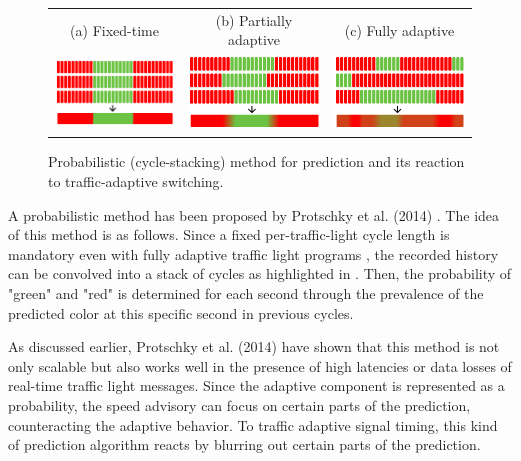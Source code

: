 \begin{figure}[b]
\centering 
\begin{tabular}{ccc}
\footnotesize{(a) Fixed-time} & \footnotesize{(b) Partially adaptive} & \footnotesize{(c) Fully adaptive} \\
\includegraphics[width=0.3\linewidth]{images/explanation-fixed-time.png} & \includegraphics[width=0.3\linewidth]{images/explanation-partially-adaptive.png} & \includegraphics[width=0.3\linewidth]{images/explanation-fully-adaptive.png}
\end{tabular}
\caption{Probabilistic (cycle-stacking) method for prediction and its reaction to traffic-adaptive switching.}
\label{fig:prediction}
\end{figure}

A probabilistic method has been proposed by Protschky et al. (2014) \cite{protschky_extensive_2014, protschky_adaptive_2014}. The idea of this method is as follows. Since a fixed per-traffic-light cycle length is mandatory even with fully adaptive traffic light programs \cite{protschky_extensive_2014}, the recorded history can be convolved into a stack of cycles as highlighted in . Then, the probability of "green" and "red" is determined for each second through the prevalence of the predicted color at this specific second in previous cycles.

As discussed earlier, Protschky et al. (2014) \cite{protschky_extensive_2014, protschky_adaptive_2014} have shown that this method is not only scalable but also works well in the presence of high latencies or data losses of real-time traffic light messages. Since the adaptive component is represented as a probability, the speed advisory can focus on certain parts of the prediction, counteracting the adaptive behavior. To traffic adaptive signal timing, this kind of prediction algorithm reacts by blurring out certain parts of the prediction. 

